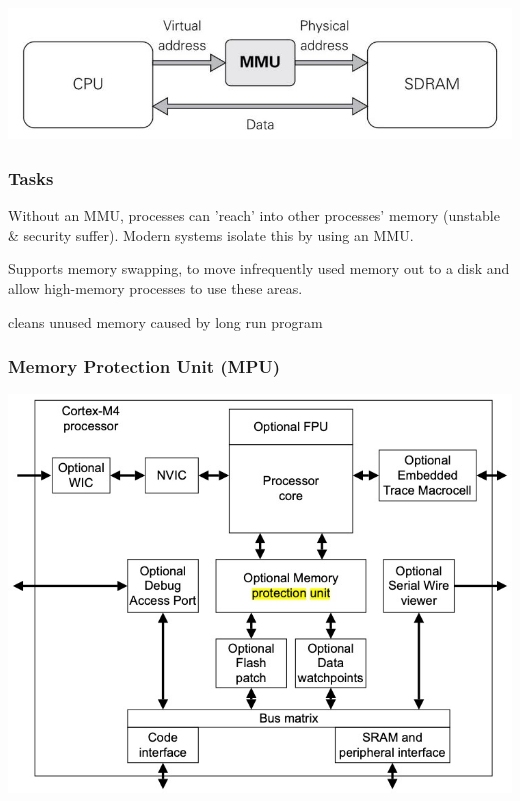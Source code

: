 \documentclass[
  10pt,
  a4paper,
]{article}
\begin{document}
\begin{multicols*}{2}
\includegraphics{images/performance/image-20.png}

\subsubsection{Tasks}\label{tasks}

{\small\begin{description}[style=sameline,parsep=0mm,labelsep=4pt]
\item[\textbf{Memory Protection}:] Without an MMU, processes can 'reach' into other processes' memory (unstable \& security suffer). Modern systems isolate this by using an MMU.
\item[\textbf{Virtual Memory}:] Supports memory swapping, to move infrequently used memory out to a disk and allow high-memory processes to use these areas.
\item[\textbf{Defragmentation}:] cleans unused memory caused by long run program
\end{description}}

\subsubsection{Memory Protection Unit
(MPU)}\label{memory-protection-unit-mpu}

\includegraphics{images/performance/image-18.png}


\end{multicols*}
\end{document}
